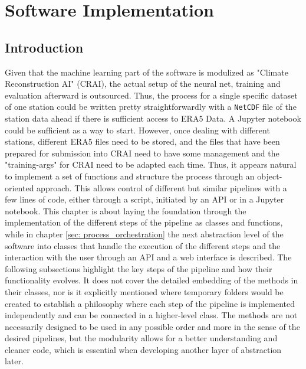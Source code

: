 \section{Software Implementation}
\label{sec: implementation}

\newcommand{\code}[1]{\texttt{#1}}

\subsection{Introduction}

Given that the machine learning part of the software is modulized as "Climate Reconstruction AI" (CRAI), the actual setup of the neural net, training and evaluation afterward is outsourced.
Thus, the process for a single specific dataset of one station could be written pretty straightforwardly with a \code{NetCDF} file of the station data ahead if there is sufficient access to ERA5 Data.
A Jupyter notebook could be sufficient as a way to start.
However, once dealing with different stations, different ERA5 files need to be stored, and the files that have been prepared for submission into CRAI need to have some management and the "training-args" for CRAI need to be adapted each time.
Thus, it appears natural to implement a set of functions and structure the process through an object-oriented approach. This allows control of different but similar pipelines with a few lines of code, either through a script, initiated by an API or in a Jupyter notebook.
This chapter is about laying the foundation through the implementation of the different steps of the pipeline as classes and functions, while in chapter \autoref{sec: process_orchestration} the next abstraction level of the software into classes that handle the execution of the different steps and the interaction with the user through an API and a web interface is described.
The following subsections highlight the key steps of the pipeline and how their functionality evolves.
It does not cover the detailed embedding of the methods in their classes, nor is it explicitly mentioned where temporary folders would be created to establish a philosophy where each step of the pipeline is implemented independently and can be connected in a higher-level class.
The methods are not necessarily designed to be used in any possible order and more in the sense of the desired pipelines, but the modularity allows for a better understanding and cleaner code, which is essential when developing another layer of abstraction later.

